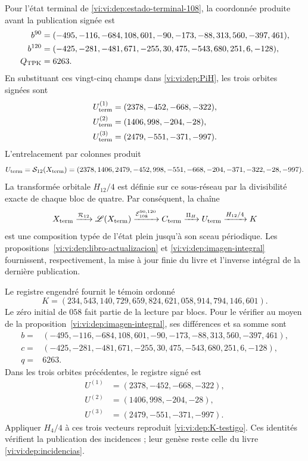 Pour l'état terminal de \eqref{vi:vi:dep:estado-terminal-108}, la coordonnée
produite avant la publication signée est
\begin{align}
 b^{90}={}&(-495,-116,-684,108,601,-90,
              -173,-88,313,560,-397,461),\notag\\
 b^{120}={}&(-425,-281,-481,671,-255,30,
               475,-543,680,251,6,-128),\notag\\
 Q_{\rm TPK}={}&6263.
 \label{vi:vi:dep:canales-terminales}
\end{align}
En substituant ces vingt-cinq champs dans \eqref{vi:vi:dep:PiH}, les trois
orbites signées sont
\begin{align*}
 U_{\rm term}^{(1)}&=(2378,-452,-668,-322),\\
 U_{\rm term}^{(2)}&=(1406,998,-204,-28),\\
 U_{\rm term}^{(3)}&=(2479,-551,-371,-997).
\end{align*}
L’entrelacement par colonnes produit
\begin{equation}
 U_{\rm term}=\mathcal S_{12}(X_{\rm term})
 =(2378,1406,2479,-452,998,-551,-668,-204,-371,-322,-28,-997).
 \label{vi:vi:dep:U-terminal}
\end{equation}
La transformée orbitale \(H_{12}/4\) est définie sur ce sous-réseau par
la divisibilité exacte de chaque bloc de quatre. Par conséquent, la chaîne
\begin{equation}
 X_{\rm term}\xrightarrow{\mathcal R_{12}}\mathscr L(X_{\rm term})
 \xrightarrow{\mathcal E_{108}^{90,120}}C_{\rm term}
 \xrightarrow{\Pi_H}U_{\rm term}
 \xrightarrow{H_{12}/4}K
 \label{vi:vi:dep:cadena-terminal-completa}
\end{equation}
est une composition typée de l'état plein jusqu'à son sceau périodique.
Les propositions~\ref{vi:vi:dep:libro-actualizacion} et
\ref{vi:vi:dep:imagen-integral} fournissent, respectivement, la mise à jour
finie du livre et l'inverse intégral de la dernière publication.

Le registre engendré fournit le témoin ordonné
\begin{equation}
 K=(234,543,140,729,659,824,621,058,914,794,146,601).
 \label{vi:vi:dep:K-testigo}
\end{equation}
Le zéro initial de \(058\) fait partie de la lecture par blocs.
Pour le vérifier au moyen de la proposition~\ref{vi:vi:dep:imagen-integral}, ses différences
et sa somme sont
\[
\begin{split}
b={}&(-495,-116,-684,108,601,-90,-173,-88,313,560,-397,461),\\
c={}&(-425,-281,-481,671,-255,30,475,-543,680,251,6,-128),\\
q={}&6263.
\end{split}
\]
Dans les trois orbites précédentes, le registre signé est
\[
 \begin{aligned}
 U^{(1)}&=(2378,-452,-668,-322),\\
 U^{(2)}&=(1406,998,-204,-28),\\
 U^{(3)}&=(2479,-551,-371,-997).
 \end{aligned}
\]
Appliquer \(H_4/4\) à ces trois vecteurs reproduit
\eqref{vi:vi:dep:K-testigo}. Ces identités vérifient la publication des
incidences ; leur genèse reste celle du livre
\eqref{vi:vi:dep:incidencias}.

